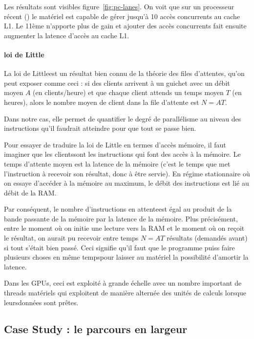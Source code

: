 Les résultats sont visibles figure~\ref{fig:pc-lanes}. On voit que sur un
processeur récent () le matériel est capable de gérer
jusqu'à 10 accès concurrents au cache L1. Le 11ème n'apporte plus de gain et
ajouter des accès concurrents fait ensuite augmenter la latence d'accès au cache
L1.

\paragraph{loi de Little} La \og loi de Little\fg est un résultat bien connu de
la théorie des files d'attentes, qu'on peut exposer comme ceci : si des clients
arrivent à un guichet avec un débit moyen $A$ (en clients/heure) et que chaque
client attends un temps moyen $T$ (en heures), alors le nombre moyen de client
dans la file d'attente est $N = AT$.

Dans notre cas, elle permet de quantifier le degré de parallélisme au niveau des
instructions qu'il faudrait atteindre pour que tout se passe bien.

Pour essayer de traduire la loi de Little en termes d'accès mémoire, il faut
imaginer que les \og clients\fg sont les instructions qui font des accès à la
mémoire. Le temps d'attente moyen est la latence de la mémoire (c'est le temps
que met l'instruction à recevoir son résultat, donc à être \og servie\fg). En
régime stationnaire où on essaye d'accéder à la mémoire au maximum, le débit des
instructions est lié au débit de la RAM.

Par conséquent, le nombre d'instructions \og en attente\fg est égal au produit
de la bande passante de la mémoire par la latence de la mémoire. Plus
précisément, entre le moment où on initie une lecture vers la RAM et le moment
où on reçoit le résultat, on aurait pu recevoir entre temps $N = AT$ résultats
(demandés avant) si tout s'était bien passé. Ceci signifie qu'il faut que le
programme puiss \og faire plusieurs choses en même temps\fg pour laisser au
matériel la possibilité d'amortir la latence.

Dans les GPUs, ceci est exploité à grande échelle avec un nombre important de
threads matériels qui exploitent de manière alternée des unités de calculs
lorsque \og leurs\fg données sont prêtes.

\subsection{Case Study : le parcours en largeur}

